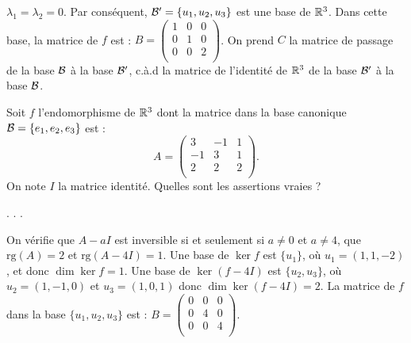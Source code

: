 \begin{question}
\begin{explanations}
$\lambda_1=\lambda_2=0$.
\vskip0mm
Par conséquent, ${\cal B}' = \{u_1,u_2,u_3\}$ est une base de $\mathbb{R}^3$. Dans cette base, la matrice de $f$ est : $B= \left(\begin{array}{rcc}
1&0&0\\
0&1&0\\ 
0&0&2\\
\end{array}\right)$. On prend $C$ la matrice de passage de la base  ${\cal B}$ à la base ${\cal B}'$, c.à.d la matrice de l'identité de $\mathbb{R}^3$ de la base ${\cal B}'$ à la base  ${\cal B}$.
\end{explanations}
\end{question}


\begin{question}
Soit $f$ l'endomorphisme de $\mathbb{R}^3$ dont la matrice dans la base canonique ${\cal B}=\{e_1,e_2,e_3\}$ est : 
$$A = \left(\begin{array}{rcc}
3&-1&1\\
-1&3&1\\ 
2&2&2\\
\end{array}\right).$$ On note $I$ la matrice identité. 
Quelles sont les assertions vraies ?
\begin{answers}  
.
.
.
\end{answers}
\vskip2mm
\begin{explanations} On vérifie que $A-aI$ est inversible si et seulement si $a\neq 0$ et $a\neq 4$, que 
$\mbox{rg} (A)=2$ et $\mbox{rg} (A-4I)=1$.  
Une base de $\ker f$ est $\{u_1\}$, où $u_1=(1,1,-2)$, et donc $\dim \ker f = 1 $.
Une base de $\ker (f-4I)$ est $\{u_2,u_3\}$, où $u_2=(1,-1,0)$ et $u_3=(1,0,1)$ donc $\dim \ker (f-4I) = 2 $.
\vskip0mm
La matrice de $f$ dans la base $\{u_1,u_2,u_3\}$ est : 
$B= \left(\begin{array}{rcc}
0&0&0\\
0&4&0\\ 
0&0&4\\
\end{array}\right).$
\end{explanations}
\end{question}


